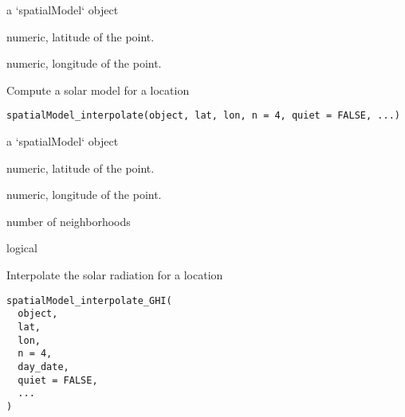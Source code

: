 \documentclass[a4paper]{book}
\begin{document}
%
\begin{Arguments}
\begin{ldescription}
\item[\code{object}] a `spatialModel` object

\item[\code{lat}] numeric, latitude of the point.

\item[\code{lon}] numeric, longitude of the point.
\end{ldescription}
\end{Arguments}
%
\begin{Description}\relax
Compute a solar model for a location
\end{Description}
%
\begin{Usage}
\begin{verbatim}
spatialModel_interpolate(object, lat, lon, n = 4, quiet = FALSE, ...)
\end{verbatim}
\end{Usage}
%
\begin{Arguments}
\begin{ldescription}
\item[\code{object}] a `spatialModel` object

\item[\code{lat}] numeric, latitude of the point.

\item[\code{lon}] numeric, longitude of the point.

\item[\code{n}] number of neighborhoods

\item[\code{quiet}] logical
\end{ldescription}
\end{Arguments}
%
\begin{Description}\relax
Interpolate the solar radiation for a location
\end{Description}
%
\begin{Usage}
\begin{verbatim}
spatialModel_interpolate_GHI(
  object,
  lat,
  lon,
  n = 4,
  day_date,
  quiet = FALSE,
  ...
)
\end{verbatim}
\end{Usage}
\end{document}

